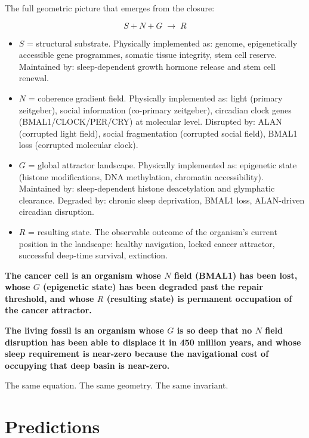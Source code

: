 \documentclass[10pt, a4paper]{article}
\begin{document}
The full geometric picture that emerges
from the closure:

\[
S + N + G \;\rightarrow\; R
\]

\begin{itemize}[itemsep=0.4em]
  \item $S$ = structural substrate.
    Physically implemented as: genome,
    epigenetically accessible gene
    programmes, somatic tissue
    integrity, stem cell reserve.
    Maintained by: sleep-dependent
    growth hormone release and stem
    cell renewal.

  \item $N$ = coherence gradient field.
    Physically implemented as: light
    (primary zeitgeber), social
    information (co-primary zeitgeber),
    circadian clock genes
    (BMAL1/CLOCK/PER/CRY) at molecular
    level. Disrupted by: ALAN
    (corrupted light field), social
    fragmentation (corrupted social
    field), BMAL1 loss (corrupted
    molecular clock).

  \item $G$ = global attractor landscape.
    Physically implemented as:
    epigenetic state (histone
    modifications, DNA methylation,
    chromatin accessibility). Maintained
    by: sleep-dependent histone
    deacetylation and glymphatic
    clearance. Degraded by: chronic
    sleep deprivation, BMAL1 loss,
    ALAN-driven circadian disruption.

  \item $R$ = resulting state. The
    observable outcome of the
    organism's current position in
    the landscape: healthy navigation,
    locked cancer attractor,
    successful deep-time survival,
    extinction.
\end{itemize}

\textbf{The cancer cell is an organism
whose $N$ field (BMAL1) has been lost,
whose $G$ (epigenetic state) has been
degraded past the repair threshold,
and whose $R$ (resulting state) is
permanent occupation of the cancer
attractor.}

\textbf{The living fossil is an organism
whose $G$ is so deep that no $N$ field
disruption has been able to displace it
in 450 million years, and whose sleep
requirement is near-zero because the
navigational cost of occupying that
deep basin is near-zero.}

The same equation. The same geometry.
The same invariant.

\section{Predictions}
\label{sec:predictions}
\end{document}
